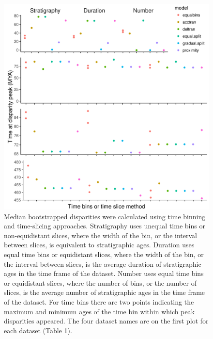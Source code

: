\documentclass[12pt,a4paper]{article}
\begin{document}
\begin{figure}[!htbp]
    \centering
    \includegraphics[width=1\linewidth, height=1\textheight, keepaspectratio]{figures/fig-peaks-age-appendix.pdf}
    \caption[Timing of peak disparity for four example datasets.]
    {Median bootstrapped disparities were calculated using time binning and time-slicing approaches. 
    Stratigraphy uses unequal time bins or non-equidistant slices, where the width of the bin, or the interval between slices, is equivalent to stratigraphic ages. 
    Duration uses equal time bins or equidistant slices, where the width of the bin, or the interval between slices, is the average duration of stratigraphic ages in the time frame of the dataset. 
    Number uses equal time bins or equidistant slices, where the number of bins, or the number of slices, is the average number of stratigraphic ages in the time frame of the dataset. 
    For time bins there are two points indicating the maximum and minimum ages of the time bin within which peak disparities appeared.
    The four dataset names are on the first plot for each dataset (Table 1).}
    \label{figure:peak3}
  \end{figure}
\end{document}
